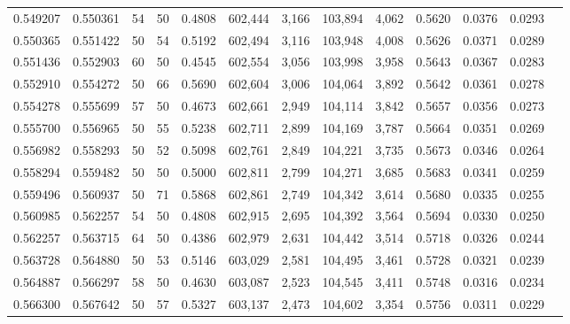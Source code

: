 \begin{tabular}{rrrrrrrrrrrrr}
0.549207 & 0.550361 &    54 &  50 &                                     0.4808 & 602,444 &   3,166 & 103,894 &   4,062 & 0.5620 & 0.0376 & 0.0293 \\
0.550365 & 0.551422 &    50 &  54 &                                     0.5192 & 602,494 &   3,116 & 103,948 &   4,008 & 0.5626 & 0.0371 & 0.0289 \\
0.551436 & 0.552903 &    60 &  50 &                                     0.4545 & 602,554 &   3,056 & 103,998 &   3,958 & 0.5643 & 0.0367 & 0.0283 \\
0.552910 & 0.554272 &    50 &  66 &                                     0.5690 & 602,604 &   3,006 & 104,064 &   3,892 & 0.5642 & 0.0361 & 0.0278 \\
0.554278 & 0.555699 &    57 &  50 &                                     0.4673 & 602,661 &   2,949 & 104,114 &   3,842 & 0.5657 & 0.0356 & 0.0273 \\
0.555700 & 0.556965 &    50 &  55 &                                     0.5238 & 602,711 &   2,899 & 104,169 &   3,787 & 0.5664 & 0.0351 & 0.0269 \\
0.556982 & 0.558293 &    50 &  52 &                                     0.5098 & 602,761 &   2,849 & 104,221 &   3,735 & 0.5673 & 0.0346 & 0.0264 \\
0.558294 & 0.559482 &    50 &  50 &                                     0.5000 & 602,811 &   2,799 & 104,271 &   3,685 & 0.5683 & 0.0341 & 0.0259 \\
0.559496 & 0.560937 &    50 &  71 &                                     0.5868 & 602,861 &   2,749 & 104,342 &   3,614 & 0.5680 & 0.0335 & 0.0255 \\
0.560985 & 0.562257 &    54 &  50 &                                     0.4808 & 602,915 &   2,695 & 104,392 &   3,564 & 0.5694 & 0.0330 & 0.0250 \\
0.562257 & 0.563715 &    64 &  50 &                                     0.4386 & 602,979 &   2,631 & 104,442 &   3,514 & 0.5718 & 0.0326 & 0.0244 \\
0.563728 & 0.564880 &    50 &  53 &                                     0.5146 & 603,029 &   2,581 & 104,495 &   3,461 & 0.5728 & 0.0321 & 0.0239 \\
0.564887 & 0.566297 &    58 &  50 &                                     0.4630 & 603,087 &   2,523 & 104,545 &   3,411 & 0.5748 & 0.0316 & 0.0234 \\
0.566300 & 0.567642 &    50 &  57 &                                     0.5327 & 603,137 &   2,473 & 104,602 &   3,354 & 0.5756 & 0.0311 & 0.0229 \\

\end{tabular}
